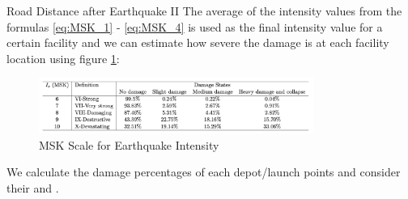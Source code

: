 \documentclass[aspectratio=169]{beamer}
\begin{document}
\begin{frame}{Road Distance after Earthquake II}
The average of the intensity values from the formulas \eqref{eq:MSK_1} - \eqref{eq:MSK_4} is used as the final intensity value for a certain facility and we can estimate how severe the damage is at each facility location using figure \ref{fig:MSK_scale}:
\begin{figure}
    \centering
    \includegraphics[width=0.8\textwidth]{eq_tab.png}
    \vspace{-10pt}
    \caption{MSK Scale for Earthquake Intensity}
    \label{fig:MSK_scale}
\end{figure}
\vspace{-5pt}
We calculate the damage percentages of each depot/launch points and consider their  and . 
\end{frame}
\end{document}
